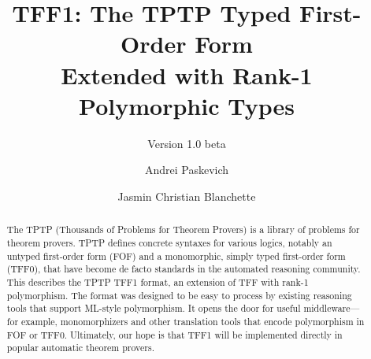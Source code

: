 \documentclass[draft,a4paper]{llncs}
\begin{document}
\title{
TFF1: The TPTP Typed First-Order Form \\ Extended with Rank-1 Polymorphic Types}
\subtitle{Version 1.0 beta}

\author{
Andrei Paskevich \and Jasmin Christian Blanchette
}


\maketitle

\begin{abstract}
The TPTP (Thousands of Problems for Theorem Provers) is a library of problems
for theorem provers. TPTP defines concrete syntaxes for various logics, notably
an untyped first-order form (FOF) and a monomorphic, simply typed first-order
form (TFF0), that have become de facto standards in the automated reasoning
community. This \paper{} describes the TPTP TFF1 format, an extension of TFF
with rank-1 polymorphism. The format was designed to be easy to process
by existing reasoning tools that support ML-style polymorphism. It opens the
door for useful middleware---for example, monomorphizers and other translation
tools that encode polymorphism in FOF or TFF0. Ultimately, our hope is that TFF1
will be implemented directly in popular automatic theorem provers.
\end{abstract}












\end{document}
